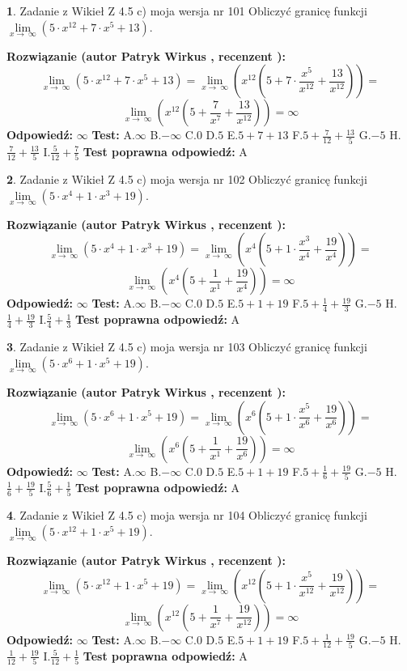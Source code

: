\documentclass[12pt, a4paper]{article}
\theoremstyle{definition} %
\newtheorem{zad}{}
\newcommand{\zadStart}[1]{\begin{zad}#1\newline}
\newcommand{\zadStop}{\end{zad}}
\newcommand{\rozwStart}[2]{\noindent \textbf{Rozwiązanie (autor #1 , recenzent #2): }\newline}
\newcommand{\rozwStop}{\newline}
\newcommand{\odpStart}{\noindent \textbf{Odpowiedź:}\newline}
\newcommand{\odpStop}{\newline}
\newcommand{\testStart}{\noindent \textbf{Test:}\newline}
\newcommand{\testStop}{\newline}
\newcommand{\kluczStart}{\noindent \textbf{Test poprawna odpowiedź:}\newline}
\newcommand{\kluczStop}{\newline}
\begin{document}
\zadStart{Zadanie z Wikieł Z 4.5 c) moja wersja nr 101}
Obliczyć granicę funkcji  $\lim\limits_{x\to\ \infty}(5 \cdot x^{12}+7 \cdot x^{5}+13)$.
\zadStop
\rozwStart{Patryk Wirkus}{}
$$\lim\limits_{x\to\ \infty}(5 \cdot x^{12}+7 \cdot x^{5}+13) = \lim\limits_{x\to\ \infty}(x^{12}(5 +7 \cdot \frac{x^{5}}{x^{12}}+\frac{13}{x^{12}})) =$$ $$\lim\limits_{x\to\ \infty}(x^{12}(5 +\frac{7}{x^{7}}+\frac{13}{x^{12}})) =\infty$$
\rozwStop
\odpStart
$\infty$
\odpStop
\testStart
A.$\infty$ B.$-\infty$ C.$0$ D.$5$ E.$5 + 7 + 13$
F.$5+\frac{7}{12}+\frac{13}{5}$ G.$-5$
H.$\frac{7}{12}+\frac{13}{5}$
I.$\frac{5}{12}+\frac{7}{5}$
\testStop
\kluczStart
A
\kluczStop



\zadStart{Zadanie z Wikieł Z 4.5 c) moja wersja nr 102}
Obliczyć granicę funkcji  $\lim\limits_{x\to\ \infty}(5 \cdot x^{4}+1 \cdot x^{3}+19)$.
\zadStop
\rozwStart{Patryk Wirkus}{}
$$\lim\limits_{x\to\ \infty}(5 \cdot x^{4}+1 \cdot x^{3}+19) = \lim\limits_{x\to\ \infty}(x^{4}(5 +1 \cdot \frac{x^{3}}{x^{4}}+\frac{19}{x^{4}})) =$$ $$\lim\limits_{x\to\ \infty}(x^{4}(5 +\frac{1}{x^{1}}+\frac{19}{x^{4}})) =\infty$$
\rozwStop
\odpStart
$\infty$
\odpStop
\testStart
A.$\infty$ B.$-\infty$ C.$0$ D.$5$ E.$5 + 1 + 19$
F.$5+\frac{1}{4}+\frac{19}{3}$ G.$-5$
H.$\frac{1}{4}+\frac{19}{3}$
I.$\frac{5}{4}+\frac{1}{3}$
\testStop
\kluczStart
A
\kluczStop



\zadStart{Zadanie z Wikieł Z 4.5 c) moja wersja nr 103}
Obliczyć granicę funkcji  $\lim\limits_{x\to\ \infty}(5 \cdot x^{6}+1 \cdot x^{5}+19)$.
\zadStop
\rozwStart{Patryk Wirkus}{}
$$\lim\limits_{x\to\ \infty}(5 \cdot x^{6}+1 \cdot x^{5}+19) = \lim\limits_{x\to\ \infty}(x^{6}(5 +1 \cdot \frac{x^{5}}{x^{6}}+\frac{19}{x^{6}})) =$$ $$\lim\limits_{x\to\ \infty}(x^{6}(5 +\frac{1}{x^{1}}+\frac{19}{x^{6}})) =\infty$$
\rozwStop
\odpStart
$\infty$
\odpStop
\testStart
A.$\infty$ B.$-\infty$ C.$0$ D.$5$ E.$5 + 1 + 19$
F.$5+\frac{1}{6}+\frac{19}{5}$ G.$-5$
H.$\frac{1}{6}+\frac{19}{5}$
I.$\frac{5}{6}+\frac{1}{5}$
\testStop
\kluczStart
A
\kluczStop



\zadStart{Zadanie z Wikieł Z 4.5 c) moja wersja nr 104}
Obliczyć granicę funkcji  $\lim\limits_{x\to\ \infty}(5 \cdot x^{12}+1 \cdot x^{5}+19)$.
\zadStop
\rozwStart{Patryk Wirkus}{}
$$\lim\limits_{x\to\ \infty}(5 \cdot x^{12}+1 \cdot x^{5}+19) = \lim\limits_{x\to\ \infty}(x^{12}(5 +1 \cdot \frac{x^{5}}{x^{12}}+\frac{19}{x^{12}})) =$$ $$\lim\limits_{x\to\ \infty}(x^{12}(5 +\frac{1}{x^{7}}+\frac{19}{x^{12}})) =\infty$$
\rozwStop
\odpStart
$\infty$
\odpStop
\testStart
A.$\infty$ B.$-\infty$ C.$0$ D.$5$ E.$5 + 1 + 19$
F.$5+\frac{1}{12}+\frac{19}{5}$ G.$-5$
H.$\frac{1}{12}+\frac{19}{5}$
I.$\frac{5}{12}+\frac{1}{5}$
\testStop
\kluczStart
A
\kluczStop
\end{document}
